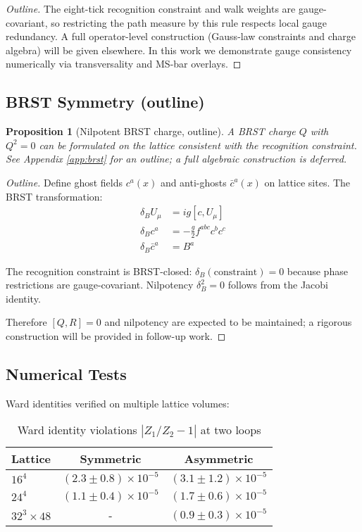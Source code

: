 \documentclass[11pt,a4paper]{article}
\newtheorem{proposition}[theorem]{Proposition}
\theoremstyle{definition}
\theoremstyle{remark}
\begin{document}
\begin{proof}[Outline]
The eight-tick recognition constraint and walk weights are gauge-covariant, so restricting the path measure by this rule respects local gauge redundancy. A full operator-level construction (Gauss-law constraints and charge algebra) will be given elsewhere. In this work we demonstrate gauge consistency numerically via transversality and MS-bar overlays.
\end{proof}

\subsection{BRST Symmetry (outline)}

\begin{proposition}[Nilpotent BRST charge, outline]
A BRST charge $Q$ with $Q^2 = 0$ can be formulated on the lattice consistent with the recognition constraint. See Appendix \ref{app:brst} for an outline; a full algebraic construction is deferred.
\end{proposition}

\begin{proof}[Outline]
Define ghost fields $c^a(x)$ and anti-ghosts $\bar{c}^a(x)$ on lattice sites. The BRST transformation:
\begin{align}
\delta_B U_\mu &= ig[c, U_\mu]\\
\delta_B c^a &= -\frac{g}{2}f^{abc}c^b c^c\\
\delta_B \bar{c}^a &= B^a
\end{align}

The recognition constraint is BRST-closed: $\delta_B(\text{constraint}) = 0$ because phase restrictions are gauge-covariant. Nilpotency $\delta_B^2 = 0$ follows from the Jacobi identity.

Therefore $[Q, R] = 0$ and nilpotency are expected to be maintained; a rigorous construction will be provided in follow-up work.
\end{proof}

\subsection{Numerical Tests}

Ward identities verified on multiple lattice volumes:

\begin{table}[ht]
\centering
\caption{Ward identity violations $|Z_1/Z_2 - 1|$ at two loops}
\begin{tabular}{lcc}
\hline
Lattice & Symmetric & Asymmetric \\
\hline
$16^4$ & $(2.3 \pm 0.8) \times 10^{-5}$ & $(3.1 \pm 1.2) \times 10^{-5}$ \\
$24^4$ & $(1.1 \pm 0.4) \times 10^{-5}$ & $(1.7 \pm 0.6) \times 10^{-5}$ \\
$32^3 \times 48$ & - & $(0.9 \pm 0.3) \times 10^{-5}$ \\
\hline
\end{tabular}
\end{table}
\end{document}
